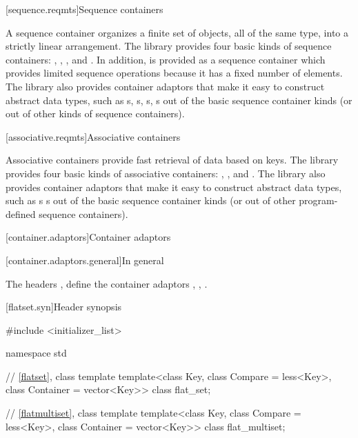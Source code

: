 \noindent\makebox[\linewidth]{\rule{\textwidth}{0.4pt}}

[sequence.reqmts]{Sequence containers}

\pnum
A sequence container organizes a finite set of objects, all of the same type, into a strictly
linear arrangement. The library provides four basic kinds of sequence containers:
, , , and . In addition,
 is provided as a sequence container which provides limited sequence operations
because it has a fixed number of elements. The library also provides container
adaptors that make it easy to construct abstract data types, such
as s, s, s, 
s
out of the basic sequence container kinds (or out of other kinds of sequence
containers).

\noindent\makebox[\linewidth]{\rule{\textwidth}{0.4pt}}

\setcounter{subsection}{5}
[associative.reqmts]{Associative containers}

\pnum
Associative containers provide fast retrieval of data based on keys.
The library provides four basic kinds of associative containers:
,
,
and
. The library also provides container adaptors that
make it easy to construct abstract data types, such as s
s out of
the basic sequence container kinds (or out of other program-defined sequence
containers).

\noindent\makebox[\linewidth]{\rule{\textwidth}{0.4pt}}

\setcounter{chapter}{21}
\setcounter{section}{5}
[container.adaptors]{Container adaptors}

[container.adaptors.general]{In general}

\pnum
The headers , 
 define the container adaptors
, , 
.

\noindent\makebox[\linewidth]{\rule{\textwidth}{0.4pt}}

\setcounter{subsection}{3}
\begin{addedblock}
[flatset.syn]{Header  synopsis}%
%

\begin{codeblock}
#include <initializer_list>

namespace std {
  // \ref{flatset}, class template 
  template<class Key, class Compare = less<Key>, class Container = vector<Key>>
    class flat_set;

  // \ref{flatmultiset}, class template 
  template<class Key, class Compare = less<Key>, class Container = vector<Key>>
    class flat_multiset;
}
\end{codeblock}
\end{addedblock}

